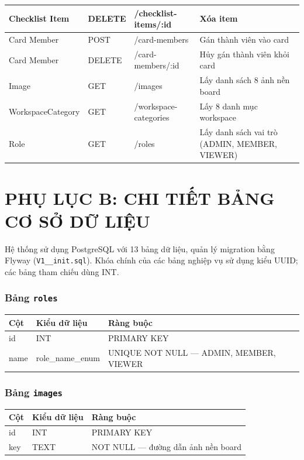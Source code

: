 \begin{longtable}{|l|l|p{5.5cm}|p{4.5cm}|}
\hline
Checklist Item & DELETE & /checklist-items/:id & Xóa item \\
\hline
Card Member & POST & /card-members & Gán thành viên vào card \\
\hline
Card Member & DELETE & /card-members/:id & Hủy gán thành viên khỏi card \\
\hline
Image & GET & /images & Lấy danh sách 8 ảnh nền board \\
\hline
WorkspaceCategory & GET & /workspace-categories & Lấy 8 danh mục workspace \\
\hline
Role & GET & /roles & Lấy danh sách vai trò (ADMIN, MEMBER, VIEWER) \\
\hline
\end{longtable}

\clearpage

\section{PHỤ LỤC B: CHI TIẾT BẢNG CƠ SỞ DỮ LIỆU}
\label{appendix:db}

Hệ thống sử dụng PostgreSQL với 13 bảng dữ liệu, quản lý migration bằng Flyway (\texttt{V1\_\_init.sql}). Khóa chính của các bảng nghiệp vụ sử dụng kiểu UUID; các bảng tham chiếu dùng INT.

\subsubsection*{Bảng \texttt{roles}}
\begin{table}[H]
\centering
\begin{tabularx}{\textwidth}{|l|l|X|}
\hline
\rowcolor{gray!20}
\textbf{Cột} & \textbf{Kiểu dữ liệu} & \textbf{Ràng buộc} \\
\hline
id & INT & PRIMARY KEY \\
\hline
name & role\_name\_enum & UNIQUE NOT NULL — ADMIN, MEMBER, VIEWER \\
\hline
\end{tabularx}
\end{table}

\subsubsection*{Bảng \texttt{images}}
\begin{table}[H]
\centering
\begin{tabularx}{\textwidth}{|l|l|X|}
\hline
\rowcolor{gray!20}
\textbf{Cột} & \textbf{Kiểu dữ liệu} & \textbf{Ràng buộc} \\
\hline
id & INT & PRIMARY KEY \\
\hline
key & TEXT & NOT NULL — đường dẫn ảnh nền board \\
\hline
\end{tabularx}
\end{table}

